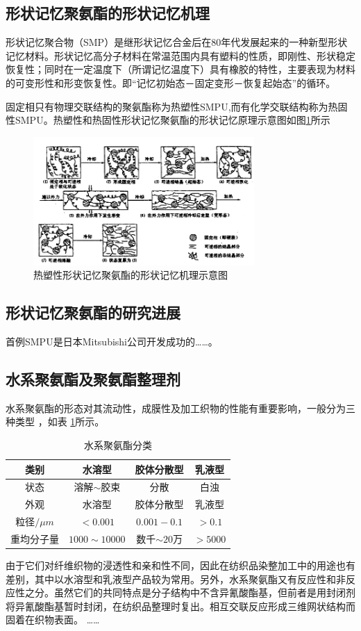 \subsection{形状记忆聚氨酯的形状记忆机理}

形状记忆聚合物（SMP）是继形状记忆合金后在80年代发展起来的一种新型形状记忆材料。形状记忆高分子材料在常温范围内具有塑料的性质，即刚性、形状稳定恢复性；同时在一定温度下（所谓记忆温度下）具有橡胶的特性，主要表现为材料的可变形性和形变恢复性。即“记忆初始态－固定变形－恢复起始态”的循环。

固定相只有物理交联结构的聚氨酯称为热塑性SMPU,而有化学交联结构称为热固性SMPU。热塑性和热固性形状记忆聚氨酯的形状记忆原理示意图如图\ref{fig:diagram}所示

\begin{figure}
 \centering
 \includegraphics[width=0.75\textwidth]{figures/figure1}
 \caption{热塑性形状记忆聚氨酯的形状记忆机理示意图}\label{fig:diagram}
\end{figure}


\subsection{形状记忆聚氨酯的研究进展}
首例SMPU是日本Mitsubishi公司开发成功的……。

\subsection{水系聚氨酯及聚氨酯整理剂}

水系聚氨酯的形态对其流动性，成膜性及加工织物的性能有重要影响，一般分为三种类型 ，如表 \ref{tab:category}所示。

\begin{table}
  \centering
  \caption{水系聚氨酯分类} \label{tab:category}
  \begin{tabular*}{0.9\textwidth}{@{\extracolsep{\fill}}cccc}
  \toprule
    类别			&水溶型		&胶体分散型		&乳液型 \\
  \midrule
    状态			&溶解$\sim$胶束	&分散		&白浊 \\
    外观			&水溶型		&胶体分散型		&乳液型 \\
    粒径$/\mu m$	&$<0.001$		&$0.001-0.1$		&$>0.1$ \\
    重均分子量	&$1000\sim 10000$	&数千$\sim 20万$ &$>5000$ \\
  \bottomrule
  \end{tabular*}
\end{table}

由于它们对纤维织物的浸透性和亲和性不同，因此在纺织品染整加工中的用途也有差别，其中以水溶型和乳液型产品较为常用。另外，水系聚氨酯又有反应性和非反应性之分。虽然它们的共同特点是分子结构中不含异氰酸酯基，但前者是用封闭剂将异氰酸酯基暂时封闭，在纺织品整理时复出。相互交联反应形成三维网状结构而固着在织物表面。
……

